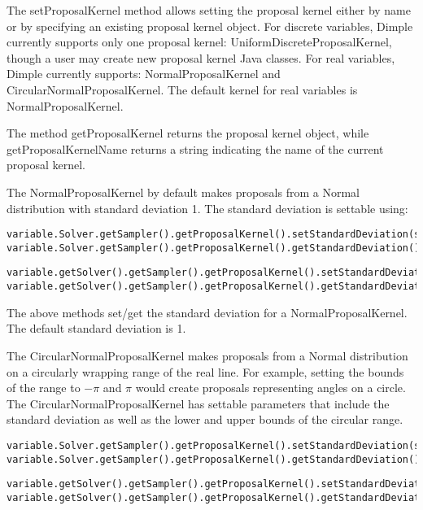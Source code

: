 The setProposalKernel method allows setting the proposal kernel either by name or by specifying an existing proposal kernel object.  For discrete variables, Dimple currently supports only one proposal kernel: UniformDiscreteProposalKernel, though a user may create new proposal kernel Java classes.  For real variables, Dimple currently supports: NormalProposalKernel and CircularNormalProposalKernel.  The default kernel for real variables is NormalProposalKernel.

The method getProposalKernel returns the proposal kernel object, while getProposalKernelName returns a string indicating the name of the current proposal kernel.

The NormalProposalKernel by default makes proposals from a Normal distribution with standard deviation 1.  The standard deviation is settable using:

\ifmatlab
\begin{lstlisting}
variable.Solver.getSampler().getProposalKernel().setStandardDeviation(std);
variable.Solver.getSampler().getProposalKernel().getStandardDeviation();
\end{lstlisting}
\fi

\ifjava
\begin{lstlisting}
variable.getSolver().getSampler().getProposalKernel().setStandardDeviation(std);
variable.getSolver().getSampler().getProposalKernel().getStandardDeviation();
\end{lstlisting}
\fi

The above methods set/get the standard deviation for a NormalProposalKernel.  The default standard deviation is 1.

The CircularNormalProposalKernel makes proposals from a Normal distribution on a circularly wrapping range of the real line.  For example, setting the bounds of the range to $-\pi$ and $\pi$ would create proposals representing angles on a circle.  The CircularNormalProposalKernel has settable parameters that include the standard deviation as well as the lower and upper bounds of the circular range.

\ifmatlab
\begin{lstlisting}
variable.Solver.getSampler().getProposalKernel().setStandardDeviation(std);
variable.Solver.getSampler().getProposalKernel().getStandardDeviation();
\end{lstlisting}
\fi

\ifjava
\begin{lstlisting}
variable.getSolver().getSampler().getProposalKernel().setStandardDeviation(std);
variable.getSolver().getSampler().getProposalKernel().getStandardDeviation();
\end{lstlisting}
\fi

